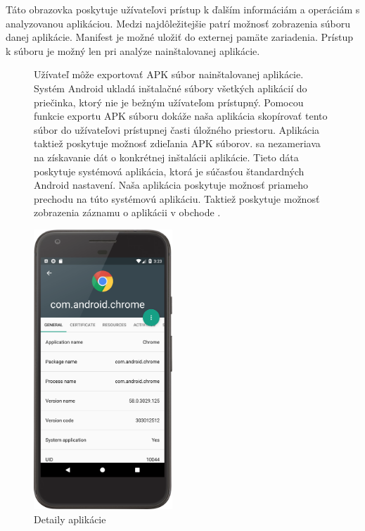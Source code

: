Táto obrazovka poskytuje užívateľovi prístup k ďalším informáciám a operáciám s analyzovanou aplikáciou. Medzi najdôležitejšie patrí možnosť zobrazenia súboru  danej aplikácie. Manifest je možné uložiť do externej pamäte zariadenia. Prístup k súboru  je možný len pri analýze nainštalovanej aplikácie.
\begin{figure}[H]
\begin{minipage}[t]{0.48\textwidth}
Užívateľ môže exportovať APK súbor nainštalovanej aplikácie. Systém Android ukladá inštalačné súbory všetkých aplikácií do priečinka, ktorý nie je bežným užívateľom prístupný. Pomocou funkcie exportu APK súboru dokáže naša aplikácia skopírovať tento súbor do užívateľovi prístupnej časti úložného priestoru. Aplikácia taktiež poskytuje možnosť zdieľania APK súborov. 
 sa nezameriava na získavanie dát o konkrétnej inštalácii aplikácie. Tieto dáta poskytuje systémová aplikácia, ktorá je súčasťou štandardných Android nastavení. Naša aplikácia poskytuje možnosť priameho prechodu na túto systémovú aplikáciu.  Taktiež poskytuje možnosť zobrazenia záznamu o aplikácii v obchode .
\end{minipage}%
\hfill
\centering
\begin{minipage}[t][][b]{0.45\textwidth}
\centering
    \includegraphics[width=5.2cm]{images/app/detail_device.png}
\centering
\caption{Detaily aplikácie}
\label{fig:app-detail}
\end{minipage}%
\end{figure}

